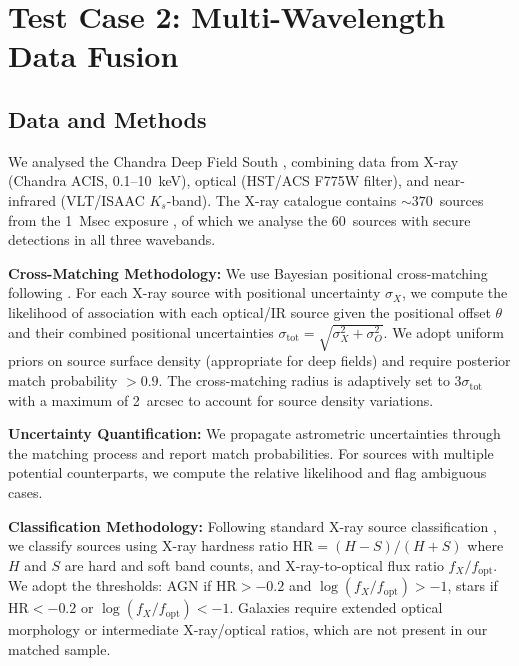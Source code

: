\documentclass[fleqn,usenatbib]{mnras}
\begin{document}
\section{Test Case 2: Multi-Wavelength Data Fusion}
\label{sec:tc2}

\subsection{Data and Methods}
\label{sec:tc2:data}

We analysed the Chandra Deep Field South \citep[CDFS;][]{Giacconi2001}, combining data from X-ray (Chandra ACIS, 0.1--10~keV), optical (HST/ACS F775W filter), and near-infrared (VLT/ISAAC $K_s$-band).
The X-ray catalogue contains $\sim\!370$~sources from the 1~Msec exposure \citep{Alexander2003}, of which we analyse the 60~sources with secure detections in all three wavebands.

\textbf{Cross-Matching Methodology:}
We use Bayesian positional cross-matching following \citet{SutherlandSaunders1992}.
For each X-ray source with positional uncertainty $\sigma_X$, we compute the likelihood of association with each optical/IR source given the positional offset $\theta$ and their combined positional uncertainties $\sigma_{\mathrm{tot}} = \sqrt{\sigma_X^2 + \sigma_O^2}$.
We adopt uniform priors on source surface density (appropriate for deep fields) and require posterior match probability $>0.9$.
The cross-matching radius is adaptively set to $3\sigma_{\mathrm{tot}}$ with a maximum of 2~arcsec to account for source density variations.

\textbf{Uncertainty Quantification:}
We propagate astrometric uncertainties through the matching process and report match probabilities.
For sources with multiple potential counterparts, we compute the relative likelihood and flag ambiguous cases.

\textbf{Classification Methodology:}
Following standard X-ray source classification \citep{Hornschemeier2001,Bauer2004}, we classify sources using X-ray hardness ratio $\mathrm{HR} = (H - S)/(H + S)$ where $H$ and $S$ are hard and soft band counts, and X-ray-to-optical flux ratio $f_X/f_{\mathrm{opt}}$.
We adopt the thresholds: AGN if $\mathrm{HR} > -0.2$ and $\log(f_X/f_{\mathrm{opt}}) > -1$, stars if $\mathrm{HR} < -0.2$ or $\log(f_X/f_{\mathrm{opt}}) < -1$.
Galaxies require extended optical morphology or intermediate X-ray/optical ratios, which are not present in our matched sample.
\end{document}
